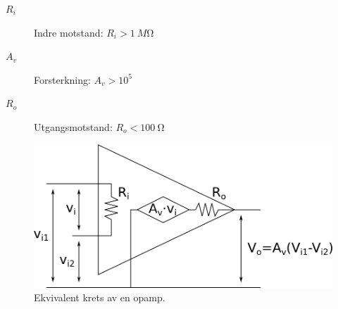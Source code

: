 \begin{description}
\item [$R_i$] Indre motstand: $R_i > \SI{1}{M\ohm}$
\item [$A_v$] Forsterkning: $A_v > 10^5$
\item [$R_o$] Utgangsmotstand: $R_o < \SI{100}{\ohm}$
\end{description}

\begin{figure}[H]
  \caption{Ekvivalent krets av en opamp.}
  \centering
  \includegraphics[width=\textwidth]{./img/treparam}
\end{figure}
